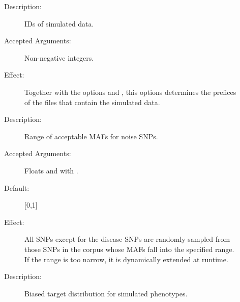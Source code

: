 \documentclass[a4paper,10pt,english]{sphinxhowto}
\begin{document}
\begin{description}
\begin{description}
\item[{}] \leavevmode\begin{description}
\item[{Description:}] \leavevmode
IDs of simulated data.

\item[{Accepted Arguments:}] \leavevmode
Non-negative integers.

\item[{Effect:}] \leavevmode
Together with the options  and , this options determines the prefices 
of the files that contain the simulated data.

\end{description}

\end{description}

\item[{\sphinxstylestrong{Optional Arguments:}}] \leavevmode\begin{description}
\item[{}] \leavevmode\begin{description}
\item[{Description:}] \leavevmode
Range of acceptable MAFs for noise SNPs.

\item[{Accepted Arguments:}] \leavevmode
Floats  and  with .

\item[{Default:}] \leavevmode
{[}0,1{]}

\item[{Effect:}] \leavevmode
All SNPs except for the disease SNPs are randomly sampled from those SNPs in the corpus whose MAFs
fall into the specified range. If the range is too narrow, it is dynamically extended at runtime.

\end{description}

\item[{}] \leavevmode\begin{description}
\item[{Description:}] \leavevmode
Biased target distribution for simulated phenotypes.


\end{description}
\end{description}
\end{description}
\end{document}
